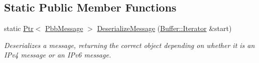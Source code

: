 \subsection*{Static Public Member Functions}
\begin{DoxyCompactItemize}
\item 
static \hyperlink{classns3_1_1Ptr}{Ptr}$<$ \hyperlink{classns3_1_1PbbMessage}{Pbb\+Message} $>$ \hyperlink{classns3_1_1PbbMessage_a58a4ce8ce3f757d5e5d9b7d89d632bc2}{Deserialize\+Message} (\hyperlink{classns3_1_1Buffer_1_1Iterator}{Buffer\+::\+Iterator} \&start)
\begin{DoxyCompactList}\small\item\em Deserializes a message, returning the correct object depending on whether it is an I\+Pv4 message or an I\+Pv6 message. \end{DoxyCompactList}\end{DoxyCompactItemize}
